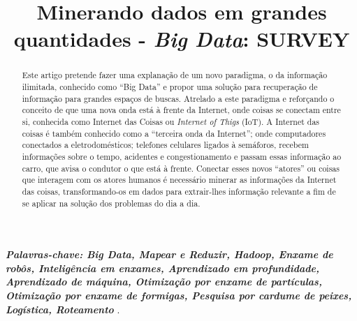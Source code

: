 \documentclass[conference,compsoc]{IEEEtran}
\begin{document}
%

\title{Minerando dados em grandes quantidades - \textit{Big Data}: SURVEY}


\author{
\and
{}
}



\maketitle

\begin{abstract}
Este artigo pretende fazer uma explanação de um novo paradigma, o da informação ilimitada, conhecido como ``Big Data'' e propor uma solução para recuperação de informação para grandes espaços de buscas. Atrelado a este paradigma e reforçando o conceito de que uma nova onda está à frente da Internet, onde coisas se conectam entre si, conhecida como Internet das Coisas ou \textit{Internet of Thigs} (IoT). A Internet das coisas é também conhecido como a ``terceira onda da Internet''; onde computadores conectados a eletrodomésticos; telefones celulares ligados à semáforos, recebem informações sobre o tempo, acidentes e congestionamento e passam essas informação ao carro, que avisa o condutor o que está à frente. Conectar esses novos ``atores'' ou coisas que interagem com os atores humanos é necessário minerar as informações da Internet das coisas, transformando-os em dados para extrair-lhes informação relevante a fim de se aplicar na solução dos problemas do dia a dia.
\end{abstract}

\vspace{0.1cm}

\textit{\textbf{Palavras-chave: Big Data, Mapear e Reduzir, Hadoop, Enxame de robôs, Inteligência em enxames, Aprendizado em profundidade, Aprendizado de máquina, Otimização por enxame de partículas, Otimização por enxame de formigas, Pesquisa por cardume de peixes, Logística, Roteamento }
}.
\end{document}
